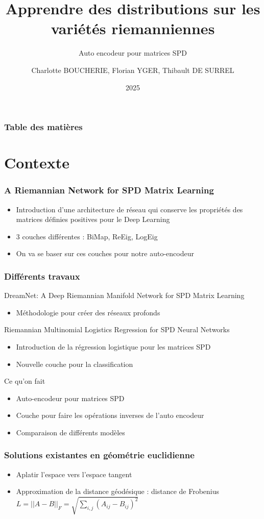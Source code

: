\documentclass{beamer}
\title[AE SPDnet] %
{Apprendre des distributions sur les variétés riemanniennes}
\subtitle{Auto encodeur pour matrices SPD}
\author[CB] %
{Charlotte BOUCHERIE, Florian YGER, Thibault DE SURREL}
\institute{LITIS}
\date[2025] %
{2025}
\begin{document}
\frame{\titlepage}

\begin{frame}
\frametitle{Table des matières}
\tableofcontents
\end{frame}

\section{Contexte}
\begin{frame}
\frametitle{A Riemannian Network for SPD Matrix Learning}
\begin{itemize}
\item Introduction d'une architecture de réseau qui conserve les propriétés des matrices définies positives pour le Deep Learning
\item 3 couches différentes : BiMap, ReEig, LogEig
\item On va se baser sur ces couches pour notre auto-encodeur
\end{itemize}

\end{frame}
\begin{frame}
\frametitle{Différents travaux}
DreamNet: A Deep Riemannian Manifold Network for SPD Matrix Learning
\begin{itemize}
    \item Méthodologie pour créer des réseaux profonds
\end{itemize}
Riemannian Multinomial Logistics Regression for SPD Neural Networks
\begin{itemize}
    \item Introduction de la régression logistique pour les matrices SPD
    \item Nouvelle couche pour la classification
\end{itemize}
\end{frame}
\begin{frame}{Ce qu'on fait}
\begin{itemize}
    \item Auto-encodeur pour matrices SPD
    \item Couche pour faire les opérations inverses de l'auto encodeur
    \item Comparaison de différents modèles
\end{itemize}
\end{frame}
\begin{frame}
\frametitle{Solutions existantes en géométrie euclidienne}
\begin{itemize}
\item Aplatir l'espace vers l'espace tangent
\item Approximation de la distance géodésique : distance de Frobenius
$ L=||A-B||_F = \sqrt{\sum_{i,j}(A_{ij}-B_{ij})^2}$
\end{itemize}
\end{frame}
\end{document}
